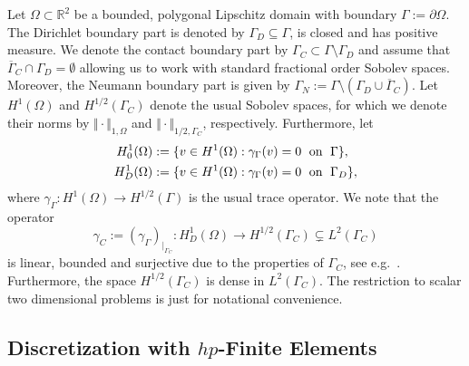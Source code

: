 \documentclass[12pt,twoside,reqno]{amsart}
\theoremstyle{definition}
\numberwithin{equation}{section}
\newcommand  {\R}  {\mathbb R}
\newcommand{\norm}[1]    {\Vert #1 \Vert}
\begin{document}
        Let $\Omega\subset \R^2$ be a bounded, polygonal Lipschitz domain with boundary $\Gamma:=\partial\Omega$.
        The Dirichlet boundary part is denoted by $\Gamma_D\subseteq \Gamma$, is closed and has positive measure.
        We denote the contact boundary part by $\Gamma_C\subset \Gamma\setminus\Gamma_D$ and assume that $\overline{\Gamma}_C \cap \Gamma_D = \emptyset$ allowing us to work with standard fractional order Sobolev spaces. Moreover, the Neumann boundary part is given by $\Gamma_N:=\Gamma\setminus(\Gamma_D\cup\overline{\Gamma}_C)$.     
        Let $H^1(\Omega)$ and $H^{1/2}(\Gamma_C)$ denote the usual Sobolev spaces, for which we denote their norms by $\norm{\cdot}_{1,\Omega}$ and $\norm{\cdot}_{1/2,\Gamma_C}$, respectively.  
        Furthermore, let
        \begin{equation*}
        \aligned
            H^1_0(\Omega)&:=\{v\in H^1(\Omega): \gamma_\Gamma(v)=0 \;\text{ on }\;\Gamma\},\\
            H^1_D(\Omega)&:=\{v\in H^1(\Omega): \gamma_\Gamma(v)=0 \;\text{ on }\;\Gamma_D\},
            \endaligned
        \end{equation*}
        where $\gamma_\Gamma:H^1(\Omega)\to H^{1/2}(\Gamma)$ is the usual trace operator. We note that the operator
        \begin{equation*}
            \gamma_C:=(\gamma_\Gamma)_{|_{\Gamma_C}}:H^1_D(\Omega)\to H^{1/2}(\Gamma_C)\subsetneq L^2(\Gamma_C)
        \end{equation*}
        is linear, bounded and surjective due to the properties of $\Gamma_C$, see e.g.~\cite{Kikuchi1988a}. Furthermore, the space $H^{1/2}(\Gamma_C)$ is dense in $L^2(\Gamma_C)$.
 The restriction to scalar two dimensional problems is just for notational convenience.
 
     \subsection{Discretization with \texorpdfstring{$hp$}{hp}-Finite Elements}\label{Discretization}
            
\end{document}

